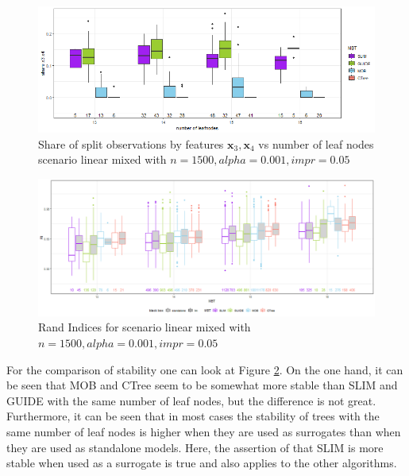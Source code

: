\begin{figure}[!htb]
\centering
    \includegraphics[width=14cm]{Figures/simulations/chapter_5_simulation_study/basic_scenarios/linear_mixed/lm_1000_standalone_share_x3x4.png}
    \caption{Share of split observations by features $\textbf{x}_3, \textbf{x}_4$ vs number of leaf nodes scenario linear mixed with $n=1500, alpha = 0.001, impr = 0.05$}
    \label{fig:lm_1000_standalone_share_x3x4}

\end{figure} 




\begin{figure}[!htb]
    \includegraphics[width=16cm]{Figures/simulations/chapter_5_simulation_study/basic_scenarios/linear_mixed/lm_1000_standalone_lm_sta.png}
    \caption{Rand Indices for scenario linear mixed with $n=1500, alpha = 0.001, impr = 0.05$}
    \label{fig:lm_1000_standalone_lm_sta}
\end{figure}

For the comparison of stability one can look at Figure \ref{fig:lm_1000_standalone_lm_sta}. On the one hand, it can be seen that MOB and CTree seem to be somewhat more stable than SLIM and GUIDE with the same number of leaf nodes, but the difference is not great. Furthermore, it can be seen that in most cases the stability of trees with the same number of leaf nodes is higher when they are used as surrogates than when they are used as standalone models. Here, the assertion of \citet{Hu.2020} that SLIM is more stable when used as a surrogate is true and also applies to the other algorithms.


